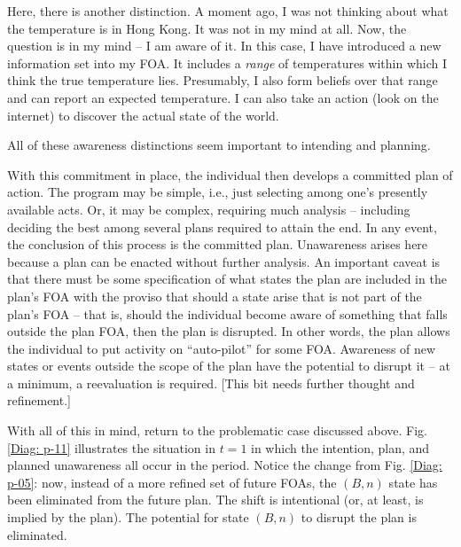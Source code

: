 \documentclass[
11pt,
titlepage,
reqno,
]{article}%
\theoremstyle{definition}
\begin{document}
Here, there is another distinction. A moment ago, I was not thinking about what the temperature is in Hong Kong. It was not in my mind at all. Now, the question is in my mind -- I am aware of it.  In this case, I have introduced a new information set into my FOA. It includes a \textit{range} of temperatures within which I think the true temperature lies. Presumably, I also form beliefs over that range and can report an expected temperature. I can also take an action (look on the internet) to discover the actual state of the world. 

All of these awareness distinctions seem important to intending and planning.  

With this commitment in place, the individual then develops a committed plan of action. The program may be simple, i.e., just selecting among one's presently available acts. Or, it may be complex, requiring much analysis -- including deciding the best among several plans required to attain the end. In any event, the conclusion of this process is the committed plan. Unawareness arises here because a plan can be enacted without further analysis. An important caveat is that there must be some specification of what states the plan are included in the plan's FOA with the proviso that should a state arise that is not part of the plan's FOA -- that is, should the individual become aware of something that falls outside the plan FOA, then the plan is disrupted. In other words, the plan allows the individual to put activity on ``auto-pilot'' for some FOA. Awareness of new states or events outside the scope of the plan have the potential to disrupt it -- at a minimum, a reevaluation is required. [This bit needs further thought and refinement.]

With all of this in mind, return to the problematic case discussed above. Fig. \ref{Diag: p-11} illustrates the situation in $t=1$ in which the intention, plan, and planned unawareness all occur in the period. Notice the change from Fig. \ref{Diag: p-05}: now, instead of a more refined set of future FOAs, the  $(B,n)$ state has been eliminated from the future plan. The shift is intentional (or, at least, is implied by the plan). The potential for state $(B,n)$ to disrupt the plan is eliminated. 
\end{document}
